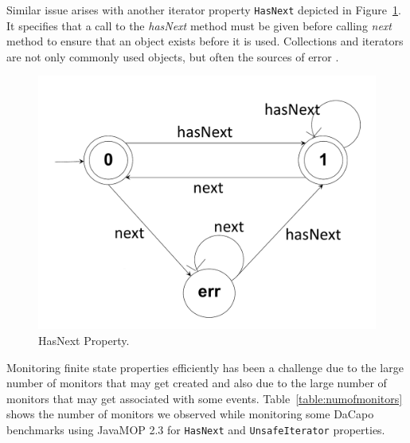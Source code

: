 Similar issue arises with another iterator property \texttt{HasNext} depicted in 
Figure~\ref{fig:hasnextfsa}. It specifies that a call to the \textit{hasNext} 
method must be given before calling \textit{next} method to ensure that an object 
exists before it is used. Collections and iterators are not only commonly used 
objects, but often the sources of error \cite{}. 

\begin{figure}[t]
\centering
  \includegraphics[trim=20cm 0cm 15cm 1cm, scale=0.2]{./images/HasNext.pdf}
  \caption[HasNext Property FSA]{HasNext Property.}
  \label{fig:hasnextfsa}
\end{figure}

Monitoring finite state properties efficiently has been a challenge due to the 
large number of monitors that may get created and also due to the large number 
of monitors that may get associated with some events. 
Table~\ref{table:numofmonitors} shows the number of monitors we observed while 
monitoring some DaCapo benchmarks using JavaMOP 2.3 for \texttt{HasNext} and 
\texttt{UnsafeIterator} properties.



